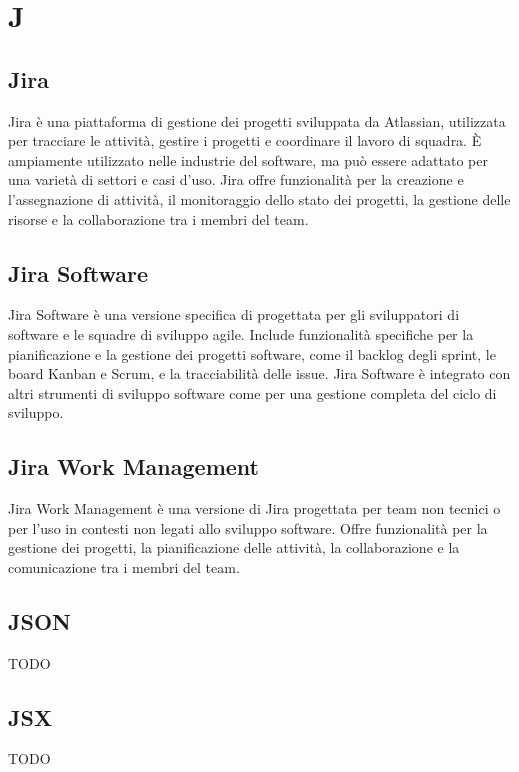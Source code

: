 \section{J}

\vspace{2em}
\subsection*{Jira}
Jira è una piattaforma di gestione dei progetti sviluppata da Atlassian, utilizzata per tracciare le attività, gestire i progetti e coordinare il lavoro di squadra. È ampiamente utilizzato nelle industrie del software, ma può essere adattato per una varietà di settori e casi d'uso. Jira offre funzionalità per la creazione e l'assegnazione di attività, il monitoraggio dello stato dei progetti, la gestione delle risorse e la collaborazione tra i membri del team.

\vspace{2em}
\subsection*{Jira Software}
Jira Software è una versione specifica di  progettata per gli sviluppatori di software e le squadre di sviluppo agile. Include funzionalità specifiche per la pianificazione e la gestione dei progetti software, come il backlog degli sprint, le board Kanban e Scrum, e la tracciabilità delle issue. Jira Software è integrato con altri strumenti di sviluppo software come  per una gestione completa del ciclo di sviluppo.

\vspace{2em}
\subsection*{Jira Work Management}
Jira Work Management è una versione di Jira progettata per team non tecnici o per l'uso in contesti non legati allo sviluppo software. Offre funzionalità per la gestione dei progetti, la pianificazione delle attività, la collaborazione e la comunicazione tra i membri del team.

\vspace{2em}
\subsection*{JSON}
TODO

\vspace{2em}
\subsection*{JSX}
TODO
